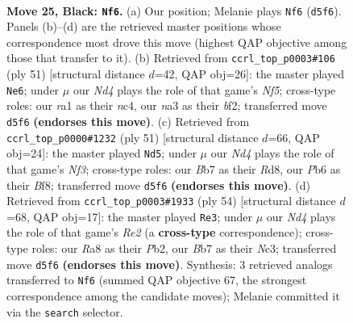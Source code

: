\documentclass[11pt]{article}
\begin{document}
\clearpage

\begin{figure}[p]\centering
\begin{subfigure}{0.46\textwidth}\centering
\resizebox{\linewidth}{!}{%
\newchessgame
\chessboard[
  setfen={r5k1/pbpp4/1p5p/3n1pp1/2P5/NP3PP1/P2PBK1P/R7 b - - 0 25},
  showmover=false,
  pgfstyle=straightmove, color=movearrow, markmove={d5-f6}
]}
\caption{}
\end{subfigure}\hfill
\begin{subfigure}{0.46\textwidth}\centering
\resizebox{\linewidth}{!}{%
\newchessgame
\chessboard[
  setfen={3r2k1/8/p1p2bp1/4pp1p/2N2n1P/2P2PP1/PPK2B2/7R b - - 0 26},
  showmover=false,
  pgfstyle=straightmove, color=movearrow, markmove={f4-e6}
]}
\caption{}
\end{subfigure}
\\[4pt]
\begin{subfigure}{0.46\textwidth}\centering
\resizebox{\linewidth}{!}{%
\newchessgame
\chessboard[
  setfen={3r1bk1/p4p2/1p3npp/2p1P3/2N5/1P4P1/PB3PKP/2R5 b - - 0 26},
  showmover=false,
  pgfstyle=straightmove, color=movearrow, markmove={f6-d5}
]}
\caption{}
\end{subfigure}\hfill
\begin{subfigure}{0.46\textwidth}\centering
\resizebox{\linewidth}{!}{%
\newchessgame
\chessboard[
  setfen={3r1bk1/1p3p2/4p1p1/p1p1P2p/P1B2P1P/2N2bP1/1PP1R3/1K6 w - - 1 28},
  showmover=false,
  pgfstyle=straightmove, color=movearrow, markmove={e2-e3}
]}
\caption{}
\end{subfigure}
\caption{\textbf{Move 25, Black: \texttt{Nf6}.} (a) Our position; Melanie plays \texttt{Nf6} (\texttt{d5f6}). Panels (b)--(d) are the retrieved master positions whose correspondence most drove this move (highest QAP objective among those that transfer to it). (b) Retrieved from \texttt{ccrl\_top\_p0003\#106} (ply 51) [structural distance $d$=42, QAP obj=26]: the master played \texttt{Ne6}; under $\mu$ our \emph{Nd4} plays the role of that game's \emph{Nf5}; cross-type roles: our \emph{r}a1 as their \emph{n}c4, our \emph{n}a3 as their \emph{b}f2; transferred move \texttt{d5f6} \textbf{(endorses this move)}. (c) Retrieved from \texttt{ccrl\_top\_p0000\#1232} (ply 51) [structural distance $d$=66, QAP obj=24]: the master played \texttt{Nd5}; under $\mu$ our \emph{Nd4} plays the role of that game's \emph{Nf3}; cross-type roles: our \emph{B}b7 as their \emph{R}d8, our \emph{P}b6 as their \emph{B}f8; transferred move \texttt{d5f6} \textbf{(endorses this move)}. (d) Retrieved from \texttt{ccrl\_top\_p0003\#1933} (ply 54) [structural distance $d$=68, QAP obj=17]: the master played \texttt{Re3}; under $\mu$ our \emph{Nd4} plays the role of that game's \emph{Re2} (a \textbf{cross-type} correspondence); cross-type roles: our \emph{R}a8 as their \emph{P}b2, our \emph{B}b7 as their \emph{N}c3; transferred move \texttt{d5f6} \textbf{(endorses this move)}. Synthesis: 3 retrieved analogs transferred to \texttt{Nf6} (summed QAP objective 67, the strongest correspondence among the candidate moves); Melanie committed it via the \texttt{search} selector.}
\label{fig:thought-m49}
\end{figure}
\end{document}

